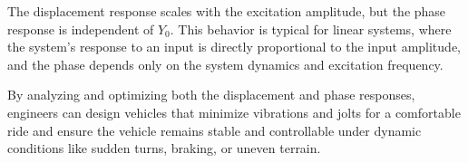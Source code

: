 \documentclass[12pt,a4paper]{article}
\begin{document}
{\vspace{10pt}}

{\vspace{5pt}}
The displacement response scales with the excitation amplitude, but the phase response is independent of \(Y_0\).
This behavior is typical for linear systems, where the system's response to an input is directly proportional to the input amplitude, and the phase depends only on the system dynamics and excitation frequency.

By analyzing and optimizing both the displacement and phase responses, engineers can design vehicles that minimize vibrations and jolts for a comfortable ride and ensure the vehicle remains stable and controllable under dynamic conditions like sudden turns, braking, or uneven terrain.
{\vspace{5pt}}

    
\end{document}
